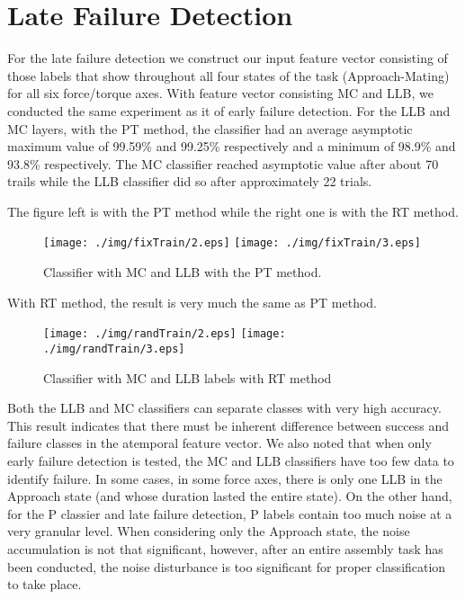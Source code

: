 \section{Late Failure Detection}
For the late failure detection we construct our input feature vector consisting of those labels that show throughout all four states of the task (Approach-Mating) for all six force/torque axes. With feature vector consisting MC and LLB, we conducted the same experiment as it of early failure detection. For the LLB and MC layers, with the PT method, the classifier had an average asymptotic maximum value of 99.59\% and 99.25\% respectively and a minimum of 98.9\% and 93.8\% respectively. The MC classifier reached asymptotic value after about 70 trails while the LLB classifier did so after approximately 22 trials. 

\indent The figure left is with the PT method while the right one is with the RT method.
\begin{figure}[h]
    \centering
    \texttt{[image: ./img/fixTrain/2.eps]}
    \texttt{[image: ./img/fixTrain/3.eps]}
    \caption{Classifier with MC and LLB with the PT method.}
    \label{fixMCLLB}
\end{figure}

\indent With RT method, the result is very much the same as PT method.
\begin{figure}[h]
    \centering
    \texttt{[image: ./img/randTrain/2.eps]}
    \texttt{[image: ./img/randTrain/3.eps]}
    \caption{Classifier with MC and LLB labels with RT method}
    \label{randMCLLB}
\end{figure}

\indent Both the LLB and MC classifiers can separate classes with very high accuracy. This result indicates that there must be inherent difference between success and failure classes in the atemporal feature vector. We also noted that when only early failure detection is tested, the MC and LLB classifiers have too few data to identify failure. In some cases, in some force axes, there is only one LLB in the Approach state (and whose duration lasted the entire state). On the other hand, for the P classier and late failure detection, P labels contain too much noise at a very granular level. When considering only the Approach state, the noise accumulation is not that significant, however, after an entire assembly task has been conducted, the noise disturbance is too significant for proper classification to take place.


